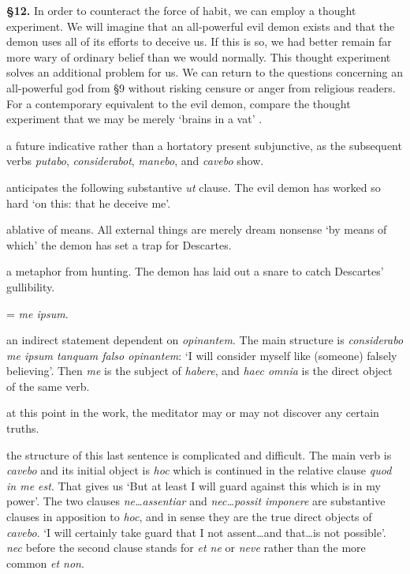\prenotes

\textbf{§12.} In order to counteract the force of habit, we can employ a thought experiment. We will imagine that an all-powerful evil demon exists and that the demon uses all of its efforts to deceive us. If this is so, we had better remain far more wary of ordinary belief than we would normally. This thought experiment solves an additional problem for us. We can return to the questions concerning an all-powerful god from §9 without risking censure or anger from religious readers. For a contemporary equivalent to the evil demon, compare the thought experiment that we may be merely `brains in a vat' \citep[5]{harman1973}.

 a future indicative rather than a hortatory present subjunctive, as the subsequent verbs \textit{putabo}, \textit{considerabot}, \textit{manebo}, and \textit{cavebo} show.

 anticipates the following substantive \textit{ut} clause. The evil demon has worked so hard `on this: that he deceive me'.

 ablative of means. All external things are merely dream nonsense `by means of which' the demon has set a trap for Descartes.

 a metaphor from hunting. The demon has laid out a snare to catch Descartes' gullibility.

 = \textit{me ipsum}.

 an indirect statement dependent on \textit{opinantem}. The main structure is \textit{considerabo me ipsum tanquam falso opinantem}: `I will consider myself like (someone) falsely believing'. Then \textit{me} is the subject of \textit{habere}, and \textit{haec omnia} is the direct object of the same verb.

 at this point in the work, the meditator may or may not discover any certain truths.

 the structure of this last sentence is complicated and difficult. The main verb is \textit{cavebo} and its initial object is \textit{hoc} which is continued in the relative clause \textit{quod in me est}. That gives us `But at least I will guard against this which is in my power'. The two clauses \textit{ne\dots assentiar} and \textit{nec\dots possit imponere} are substantive clauses in apposition to \textit{hoc}, and in sense they are the true direct objects of \textit{cavebo}. `I will certainly take guard that I not assent\dots and that\dots is not possible'. \textit{nec} before the second clause stands for \textit{et ne} or \textit{neve} rather than the more common \textit{et non}.

